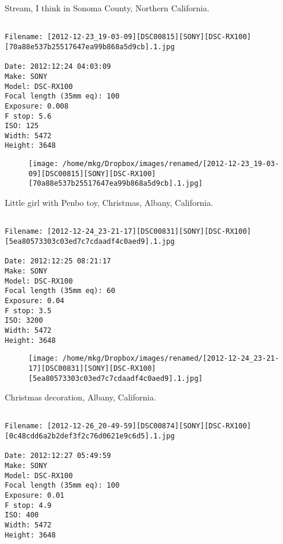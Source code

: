 \clearpage
\onecolumn
\noindent Stream, I think in Sonoma County, Northern California.
\noindent
\begin{lstlisting}

Filename: [2012-12-23_19-03-09][DSC00815][SONY][DSC-RX100][70a88e537b25517647ea99b868a5d9cb].1.jpg

Date: 2012:12:24 04:03:09
Make: SONY
Model: DSC-RX100
Focal length (35mm eq): 100
Exposure: 0.008
F stop: 5.6
ISO: 125
Width: 5472
Height: 3648
\end{lstlisting}
\clearpage

\begin{figure}
\texttt{[image: /home/mkg/Dropbox/images/renamed/[2012-12-23\_19-03-09][DSC00815][SONY][DSC-RX100][70a88e537b25517647ea99b868a5d9cb].1.jpg]}
\end{figure}
    
\clearpage
\onecolumn
\noindent Little girl with Penbo toy, Christmas, Albany, California.
\noindent
\begin{lstlisting}

Filename: [2012-12-24_23-21-17][DSC00831][SONY][DSC-RX100][5ea80573303c03ed7c7cdaadf4c0aed9].1.jpg

Date: 2012:12:25 08:21:17
Make: SONY
Model: DSC-RX100
Focal length (35mm eq): 60
Exposure: 0.04
F stop: 3.5
ISO: 3200
Width: 5472
Height: 3648
\end{lstlisting}
\clearpage

\begin{figure}
\texttt{[image: /home/mkg/Dropbox/images/renamed/[2012-12-24\_23-21-17][DSC00831][SONY][DSC-RX100][5ea80573303c03ed7c7cdaadf4c0aed9].1.jpg]}
\end{figure}
    
\clearpage
\onecolumn
\noindent Christmas decoration, Albany, California.
\noindent
\begin{lstlisting}

Filename: [2012-12-26_20-49-59][DSC00874][SONY][DSC-RX100][0c48cdd6a2b2def3f2c76d0621e9c6d5].1.jpg

Date: 2012:12:27 05:49:59
Make: SONY
Model: DSC-RX100
Focal length (35mm eq): 100
Exposure: 0.01
F stop: 4.9
ISO: 400
Width: 5472
Height: 3648
\end{lstlisting}
\clearpage

